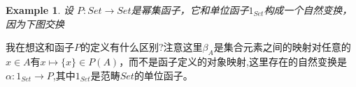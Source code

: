 \documentclass{article}
\newtheorem{example}[theorem]{Example}
\begin{document}
\begin{example}
设 $P \colon Set \rightarrow Set $是幂集函子，它和单位函子$1_{Set}$构成一个自然变换，因为下图交换
\begin{center}
\end{center}
\end{example}
我在想这和函子$P$的定义有什么区别?注意这里$\beta_A$是集合元素之间的映射对任意的$x \in A$有$x \mapsto \{x\} \in P(A)$，而不是函子定义的对象映射,这里存在的自然变换是$\alpha \colon 1_{Set} \rightarrow P$,其中$1_{Set}$是范畴$Set$的单位函子。
\end{document}
